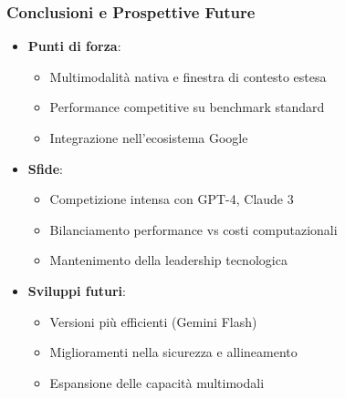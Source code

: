 \documentclass[aspectratio=169]{beamer}
\begin{document}
\begin{frame}
\frametitle{Conclusioni e Prospettive Future}
\begin{itemize}
    \item \textbf{Punti di forza}:
    \begin{itemize}
        \item Multimodalità nativa e finestra di contesto estesa
        \item Performance competitive su benchmark standard
        \item Integrazione nell'ecosistema Google
    \end{itemize}
    \item \textbf{Sfide}:
    \begin{itemize}
        \item Competizione intensa con GPT-4, Claude 3
        \item Bilanciamento performance vs costi computazionali
        \item Mantenimento della leadership tecnologica
    \end{itemize}
    \item \textbf{Sviluppi futuri}:
    \begin{itemize}
        \item Versioni più efficienti (Gemini Flash)
        \item Miglioramenti nella sicurezza e allineamento
        \item Espansione delle capacità multimodali
    \end{itemize}
\end{itemize}
\end{frame}
%
\end{document}
